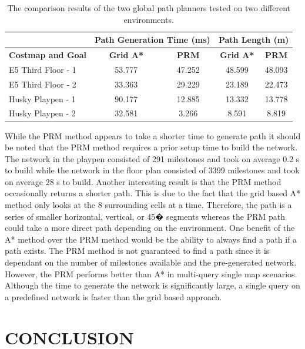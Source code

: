 \documentclass[letterpaper, 10 pt, conference]{ieeeconf}  %
\begin{document}
\begin{table}[h]
\caption{The comparison results of the two global path planners tested on two different environments.}
\label{compare_table}
\begin{center}
\begin{tabular}{l|c|c|c|c|}
\cline{2-5} & \multicolumn{2}{c|}{\textbf{Path Generation Time (ms)}} & \multicolumn{2}{c|}{\textbf{Path Length (m)}} \\ \hline
\multicolumn{1}{|l|}{\textbf{Costmap and Goal}} & \textbf{Grid A*} & \textbf{PRM} & \textbf{Grid A*} & \textbf{PRM} \\ \hline
\multicolumn{1}{|l|}{E5 Third Floor - 1} & 53.777 & 47.252 & 48.599 & 48.093 \\ \hline
\multicolumn{1}{|l|}{E5 Third Floor - 2} & 33.363 & 29.229 & 23.189 & 22.473 \\ \hline
\multicolumn{1}{|l|}{Husky Playpen - 1} & 90.177 & 12.885 & 13.332 & 13.778 \\ \hline
\multicolumn{1}{|l|}{Husky Playpen - 2} & 32.581 & 3.266 & 8.591 & 8.819 \\ \hline
\end{tabular}
\end{center}
\end{table}

While the PRM method appears to take a shorter time to generate path it should be noted that the PRM method requires a prior setup time to build the network. The network in the playpen consisted of 291 milestones and took on average 0.2 s to build while the network in the floor plan consisted of 3399 milestones and took on average 28 s to build. Another interesting result is that the PRM method occasionally returns a shorter path. This is due to the fact that the grid based A* method only looks at the 8 surrounding cells at a time. Therefore, the path is a series of smaller horizontal, vertical, or 45� segments whereas the PRM path could take a more direct path depending on the environment. One benefit of the A* method over the PRM method would be the ability to always find a path if a path exists. The PRM method is not guaranteed to find a path since it is dependant on the number of milestones available and the pre-generated network. However, the PRM performs better than A* in multi-query single map scenarios. Although the time to generate the network is significantly large, a single query on a predefined network is faster than the grid based approach.

\section{CONCLUSION}
\end{document}
